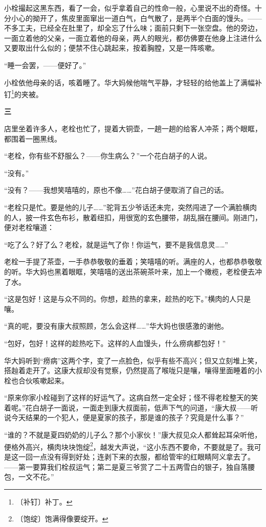 \documentclass[12pt,UTF-8,openany]{ctexbook}
\begin{document}
\begin{normalsize}
    小栓撮起这黑东西，看了一会，似乎拿着自己的性命一般，心里说不出的奇怪。十分小心的拗开了，焦皮里面窜出一道白气，白气散了，是两半个白面的馒头。——不多工夫，已经全在肚里了，却全忘了什么味；面前只剩下一张空盘。他的旁边，一面立着他的父亲，一面立着他的母亲，两人的眼光，都仿佛要在他身上注进什么又要取出什么似的；便禁不住心跳起来，按着胸膛，又是一阵咳嗽。
    
    “睡一会罢，——便好了。”
    
    小栓依他母亲的话，咳着睡了。华大妈候他喘气平静，才轻轻的给他盖上了满幅补钉\footnote{〔补钉〕补丁。}的夹被。
    
    \begin{center}\textbf{三}\end{center}
    
    店里坐着许多人，老栓也忙了，提着大铜壶，一趟一趟的给客人冲茶；两个眼眶，都围着一圈黑线。
    
    “老栓，你有些不舒服么？——你生病么？”一个花白胡子的人说。
    
    “没有。”
    
    “没有？——我想笑嘻嘻的，原也不像……”花白胡子便取消了自己的话。
    
    “老栓只是忙。要是他的儿子……”驼背五少爷话还未完，突然闯进了一个满脸横肉的人，披一件玄色布衫，散着纽扣，用很宽的玄色腰带，胡乱捆在腰间。刚进门，便对老栓嚷道：
    
    “吃了么？好了么？老栓，就是运气了你！你运气，要不是我信息灵……”
    
    老栓一手提了茶壶，一手恭恭敬敬的垂着；笑嘻嘻的听。满座的人，也都恭恭敬敬的听。华大妈也黑着眼眶，笑嘻嘻的送出茶碗茶叶来，加上一个橄榄，老栓便去冲了水。
    
    “这是包好！这是与众不同的。你想，趁热的拿来，趁热的吃下。”横肉的人只是嚷。
    
    “真的呢，要没有康大叔照顾，怎么会这样……”华大妈也很感激的谢他。
    
    “包好，包好！这样的趁热吃下。这样的人血馒头，什么痨病都包好！”
    
    华大妈听到“痨病”这两个字，变了一点脸色，似乎有些不高兴；但又立刻堆上笑，搭赸着走开了。这康大叔却没有觉察，仍然提高了喉咙只是嚷，嚷得里面睡着的小栓也合伙咳嗽起来。
    
    “原来你家小栓碰到了这样的好运气了。这病自然一定全好；怪不得老栓整天的笑着呢。”花白胡子一面说，一面走到康大叔面前，低声下气的问道，“康大叔——听说今天结果的一个犯人，便是夏家的孩子，那是谁的孩子？究竟是什么事？”
    
    “谁的？不就是夏四奶奶的儿子么？那个小家伙！”康大叔见众人都耸起耳朵听他，便格外高兴，横肉块块饱绽\footnote{〔饱绽〕饱满得像要绽开。}，越发大声说，“这小东西不要命，不要就是了。我可是这一回一点没有得到好处；连剥下来的衣服，都给管牢的红眼睛阿义拿去了。——第一要算我们栓叔运气；第二是夏三爷赏了二十五两雪白的银子，独自落腰包，一文不花。”
    

\end{normalsize}
\end{document}
